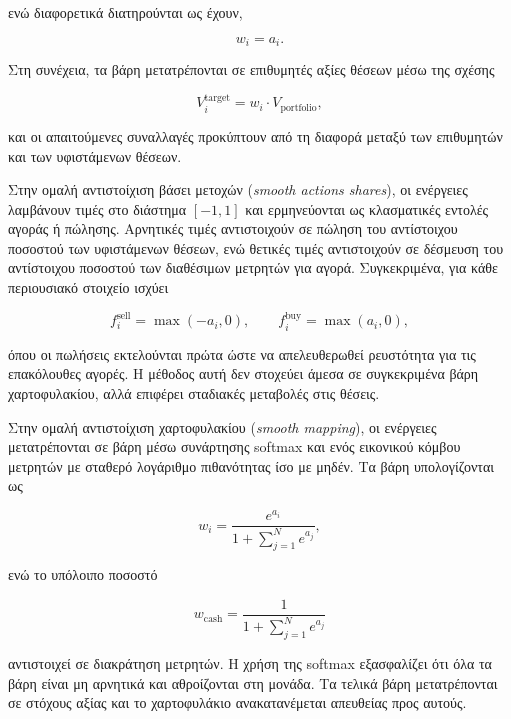 ενώ διαφορετικά διατηρούνται ως έχουν,

\begin{equation}
w_i=a_i.
\end{equation}

Στη συνέχεια, τα βάρη μετατρέπονται σε επιθυμητές αξίες θέσεων μέσω της σχέσης

\begin{equation}
V_i^{\mathrm{target}} = w_i \cdot V_{\mathrm{portfolio}},
\end{equation}

και οι απαιτούμενες συναλλαγές προκύπτουν από τη διαφορά μεταξύ των επιθυμητών και των υφιστάμενων θέσεων.

Στην ομαλή αντιστοίχιση βάσει μετοχών (\textit{smooth actions shares}), οι ενέργειες λαμβάνουν τιμές στο διάστημα $[-1,1]$ και ερμηνεύονται ως κλασματικές εντολές αγοράς ή πώλησης. Αρνητικές τιμές αντιστοιχούν σε πώληση του αντίστοιχου ποσοστού των υφιστάμενων θέσεων, ενώ θετικές τιμές αντιστοιχούν σε δέσμευση του αντίστοιχου ποσοστού των διαθέσιμων μετρητών για αγορά. Συγκεκριμένα, για κάθε περιουσιακό στοιχείο ισχύει

\begin{equation}
f_i^{\mathrm{sell}}=\max(-a_i,0),
\qquad
f_i^{\mathrm{buy}}=\max(a_i,0),
\end{equation}

όπου οι πωλήσεις εκτελούνται πρώτα ώστε να απελευθερωθεί ρευστότητα για τις επακόλουθες αγορές. Η μέθοδος αυτή δεν στοχεύει άμεσα σε συγκεκριμένα βάρη χαρτοφυλακίου, αλλά επιφέρει σταδιακές μεταβολές στις θέσεις.

Στην ομαλή αντιστοίχιση χαρτοφυλακίου (\textit{smooth mapping}), οι ενέργειες μετατρέπονται σε βάρη μέσω συνάρτησης softmax και ενός εικονικού κόμβου μετρητών με σταθερό λογάριθμο πιθανότητας ίσο με μηδέν. Τα βάρη υπολογίζονται ως

\begin{equation}
w_i=
\frac{e^{a_i}}
{1+\sum_{j=1}^{N} e^{a_j}},
\end{equation}

ενώ το υπόλοιπο ποσοστό

\begin{equation}
w_{\mathrm{cash}}=
\frac{1}
{1+\sum_{j=1}^{N} e^{a_j}}
\end{equation}

αντιστοιχεί σε διακράτηση μετρητών. Η χρήση της softmax εξασφαλίζει ότι όλα τα βάρη είναι μη αρνητικά και αθροίζονται στη μονάδα. Τα τελικά βάρη μετατρέπονται σε στόχους αξίας και το χαρτοφυλάκιο ανακατανέμεται απευθείας προς αυτούς.


